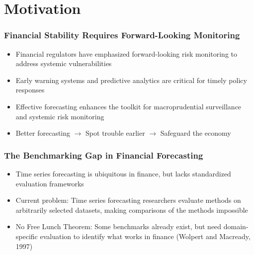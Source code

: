 \documentclass[ignorenonframetext, 9pt]{beamer}
\begin{document}

\section{Motivation}

\begin{frame}
\frametitle{Financial Stability Requires Forward-Looking Monitoring}
\begin{itemize}
\item Financial regulators have emphasized \alert{forward-looking risk monitoring} to address systemic vulnerabilities
\vspace{0.3cm}
\item Early warning systems and predictive analytics are critical for timely policy responses
\vspace{0.3cm}
\item Effective forecasting enhances the toolkit for macroprudential surveillance and systemic risk monitoring
\vspace{0.3cm}
\item \alert{Better forecasting $\rightarrow$ Spot trouble earlier $\rightarrow$ Safeguard the economy}
\end{itemize}
\end{frame}

\begin{frame}
\frametitle{The Benchmarking Gap in Financial Forecasting}
\begin{itemize}
\item Time series forecasting is ubiquitous in finance, but lacks standardized evaluation frameworks
\vspace{0.2cm}
\item Current problem: Time series forecasting researchers evaluate methods on \alert{arbitrarily selected datasets}, making comparisons of the methods impossible
\vspace{0.2cm}
\item \alert{No Free Lunch Theorem}: Some benchmarks already exist, but need domain-specific evaluation to identify what works in finance (Wolpert and Macready, 1997)
\end{itemize}
\end{frame}
\end{document}
